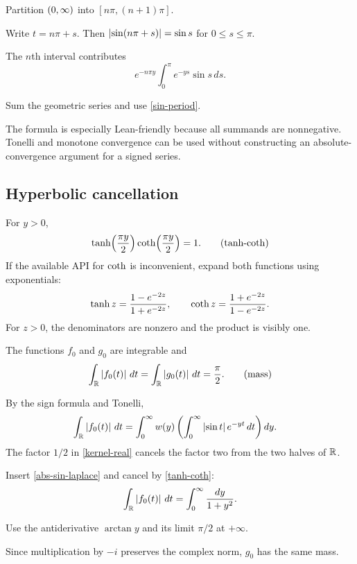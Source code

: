 \begin{proofoutline}
\item Partition $(0,\infty)$ into $[n\pi,(n+1)\pi]$.
\item Write $t=n\pi+s$. Then $\left\lvert \sin(n\pi+s)\right\rvert=\sin s$ for $0\le s\le\pi$.
\item The $n$th interval contributes
\[
  e^{-n\pi y}\int_0^\pi e^{-ys}\sin s\,ds.
\]
\item Sum the geometric series and use \eqref{sin-period}.
\end{proofoutline}

The formula is especially Lean-friendly because all summands are nonnegative. Tonelli and monotone convergence can be used without constructing an absolute-convergence argument for a signed series.

\subsection{Hyperbolic cancellation}

For $y>0$,
\begin{equation}
  \tanh\!\left(\frac{\pi y}{2}\right)
  \operatorname{coth}\!\left(\frac{\pi y}{2}\right)=1.
  \tag{tanh-coth}\label{tanh-coth}
\end{equation}
If the available API for $\operatorname{coth}$ is inconvenient, expand both functions using exponentials:
\[
  \tanh z=\frac{1-e^{-2z}}{1+e^{-2z}},
  \qquad
  \operatorname{coth} z=\frac{1+e^{-2z}}{1-e^{-2z}}.
\]
For $z>0$, the denominators are nonzero and the product is visibly one.

\begin{theorem}
The functions $f_0$ and $g_0$ are integrable and
\begin{equation}
  \int_{\mathbb{R}}\left\lvert f_0(t)\right\rvert\,dt
  =\int_{\mathbb{R}}\left\lvert g_0(t)\right\rvert\,dt
  =\frac\pi2.
  \tag{mass}\label{mass}
\end{equation}
\end{theorem}

\begin{proofoutline}
\item By the sign formula and Tonelli,
\begin{align*}
\int_{\mathbb{R}}\left\lvert f_0(t)\right\rvert\,dt
&=\int_0^\infty
    w(y)\left(\int_0^\infty\left\lvert \sin t\right\rvert e^{-yt}\,dt\right)dy.
\end{align*}
The factor $1/2$ in \eqref{kernel-real} cancels the factor two from the two halves of $\mathbb{R}$.
\item Insert \eqref{abs-sin-laplace} and cancel by \eqref{tanh-coth}:
\[
  \int_{\mathbb{R}}\left\lvert f_0(t)\right\rvert\,dt
  =\int_0^\infty\frac{dy}{1+y^2}.
\]
\item Use the antiderivative $\arctan y$ and its limit $\pi/2$ at $+\infty$.
\item Since multiplication by $-i$ preserves the complex norm, $g_0$ has the same mass.
\end{proofoutline}

